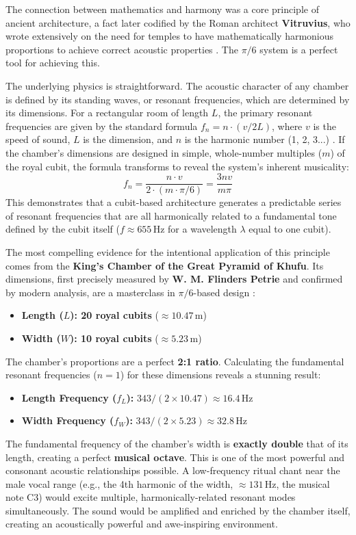 \documentclass[11pt]{article}
\begin{document}
The connection between mathematics and harmony was a core principle of ancient architecture, a fact later codified by the Roman architect \textbf{Vitruvius}, who wrote extensively on the need for temples to have mathematically harmonious proportions to achieve correct acoustic properties \cite[Book V]{vitruvius_de_architectura}. The $\pi/6$ system is a perfect tool for achieving this.

The underlying physics is straightforward. The acoustic character of any chamber is defined by its standing waves, or resonant frequencies, which are determined by its dimensions. For a rectangular room of length $L$, the primary resonant frequencies are given by the standard formula $f_n = n \cdot (v / 2L)$, where $v$ is the speed of sound, $L$ is the dimension, and $n$ is the harmonic number (1, 2, 3...) \cite{berg1995physics}. If the chamber's dimensions are designed in simple, whole-number multiples ($m$) of the royal cubit, the formula transforms to reveal the system's inherent musicality:
\[
f_n = \frac{n \cdot v}{2 \cdot (m \cdot \pi/6)} = \frac{3nv}{m\pi}
\]
This demonstrates that a cubit-based architecture generates a predictable series of resonant frequencies that are all harmonically related to a fundamental tone defined by the cubit itself ($f \approx 655\,\text{Hz}$ for a wavelength $\lambda$ equal to one cubit).

The most compelling evidence for the intentional application of this principle comes from the \textbf{King's Chamber of the Great Pyramid of Khufu}. Its dimensions, first precisely measured by \textbf{W. M. Flinders Petrie} and confirmed by modern analysis, are a masterclass in $\pi/6$-based design \cite{petrie1883pyramids, rossi2004architecture}:
\begin{itemize}
    \item \textbf{Length ($L$): 20 royal cubits} ($\approx 10.47\,\text{m}$)
    \item \textbf{Width ($W$): 10 royal cubits} ($\approx 5.23\,\text{m}$)
\end{itemize}
The chamber's proportions are a perfect \textbf{2:1 ratio}. Calculating the fundamental resonant frequencies ($n=1$) for these dimensions reveals a stunning result:
\begin{itemize}
    \item \textbf{Length Frequency ($f_L$):} $343 / (2 \times 10.47) \approx 16.4\,\text{Hz}$
    \item \textbf{Width Frequency ($f_W$):} $343 / (2 \times 5.23) \approx 32.8\,\text{Hz}$
\end{itemize}
The fundamental frequency of the chamber's width is \textbf{exactly double} that of its length, creating a perfect \textbf{musical octave}. This is one of the most powerful and consonant acoustic relationships possible. A low-frequency ritual chant near the male vocal range (e.g., the 4th harmonic of the width, $\approx 131\,\text{Hz}$, the musical note C3) would excite multiple, harmonically-related resonant modes simultaneously. The sound would be amplified and enriched by the chamber itself, creating an acoustically powerful and awe-inspiring environment.
\end{document}
